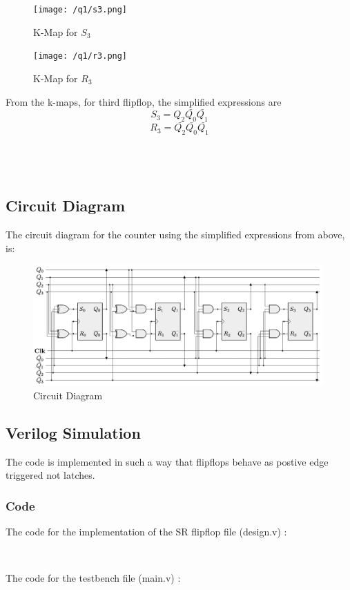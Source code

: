 \documentclass[a4paper]{article}
\begin{document}
\begin{figure}[H]
    \centering
    \begin{minipage}[c]{0.45\textwidth}
        \centering
        \texttt{[image: /q1/s3.png]}
        \caption{K-Map for $S_{3}$}
    \end{minipage}
    \begin{minipage}[c]{0.45\textwidth}
        \centering
        \texttt{[image: /q1/r3.png]}
        \caption{K-Map for $R_{3}$}
    \end{minipage}
\end{figure}
From the k-maps, for third flipflop, the simplified expressions are
$$S_{3}=Q_{2}\bar{Q_{0}}\bar{Q_{1}}$$
$$R_{3}=\bar{Q_{2}}\bar{Q_{0}}\bar{Q_{1}}$$ \\ \\ \\
\subsection{Circuit Diagram}
The circuit diagram for the counter using the simplified expressions from above, is:
\begin{figure}[H]
    \centering
    \includegraphics[width=0.99\textwidth]{q1/circuit.png}
    \caption{Circuit Diagram}
\end{figure}
\subsection{Verilog Simulation}
The code is implemented in such a way that flipflops behave as postive edge triggered not latches. 
\subsubsection{Code}
The code for the implementation of the SR flipflop file (design.v) :
\inputminted[bgcolor=bg,frame=lines,framesep=2mm,numbers=left]
{Verilog}{./code-files/q1/design.v} \\
The code for the testbench file (main.v) :
\inputminted[bgcolor=bg,frame=lines,framesep=2mm,numbers=left]
{Verilog}{./code-files/q1/main.v} \\ \\ \\
\end{document}
